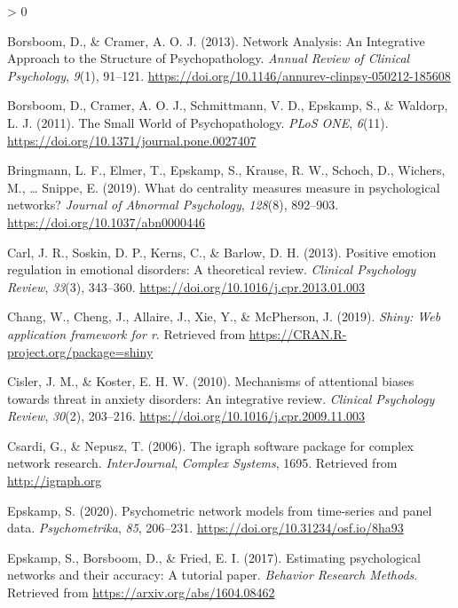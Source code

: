 \documentclass[
  english,
  man]{apa6}
\newlength{\cslhangindent}
\newenvironment{CSLReferences}[2] %
 {%
  \setlength{\parindent}{0pt}
  \ifodd #1 \everypar{\setlength{\hangindent}{\cslhangindent}}\ignorespaces\fi
  \ifnum #2 > 0
  \setlength{\parskip}{#2\baselineskip}
  \fi
 }%
 {}
\begin{document}
\begin{CSLReferences}{1}{0}
\leavevmode\hypertarget{ref-borsboom_network_2013}{}%
Borsboom, D., \& Cramer, A. O. J. (2013). Network {Analysis}: {An} {Integrative} {Approach} to the {Structure} of {Psychopathology}. \emph{Annual Review of Clinical Psychology}, \emph{9}(1), 91--121. \url{https://doi.org/10.1146/annurev-clinpsy-050212-185608}

\leavevmode\hypertarget{ref-borsboom_small_2011}{}%
Borsboom, D., Cramer, A. O. J., Schmittmann, V. D., Epskamp, S., \& Waldorp, L. J. (2011). The {Small} {World} of {Psychopathology}. \emph{PLoS ONE}, \emph{6}(11). \url{https://doi.org/10.1371/journal.pone.0027407}

\leavevmode\hypertarget{ref-bringmann_what_2019}{}%
Bringmann, L. F., Elmer, T., Epskamp, S., Krause, R. W., Schoch, D., Wichers, M., \ldots{} Snippe, E. (2019). What do centrality measures measure in psychological networks? \emph{Journal of Abnormal Psychology}, \emph{128}(8), 892--903. \url{https://doi.org/10.1037/abn0000446}

\leavevmode\hypertarget{ref-Carl2013}{}%
Carl, J. R., Soskin, D. P., Kerns, C., \& Barlow, D. H. (2013). Positive emotion regulation in emotional disorders: {A} theoretical review. \emph{Clinical Psychology Review}, \emph{33}(3), 343--360. \url{https://doi.org/10.1016/j.cpr.2013.01.003}

\leavevmode\hypertarget{ref-R-shiny}{}%
Chang, W., Cheng, J., Allaire, J., Xie, Y., \& McPherson, J. (2019). \emph{Shiny: Web application framework for r}. Retrieved from \url{https://CRAN.R-project.org/package=shiny}

\leavevmode\hypertarget{ref-Cisler2010a}{}%
Cisler, J. M., \& Koster, E. H. W. (2010). Mechanisms of attentional biases towards threat in anxiety disorders: {An} integrative review. \emph{Clinical Psychology Review}, \emph{30}(2), 203--216. \url{https://doi.org/10.1016/j.cpr.2009.11.003}

\leavevmode\hypertarget{ref-R-igraph}{}%
Csardi, G., \& Nepusz, T. (2006). The igraph software package for complex network research. \emph{InterJournal}, \emph{Complex Systems}, 1695. Retrieved from \url{http://igraph.org}

\leavevmode\hypertarget{ref-epskamp_psychometric_2020}{}%
Epskamp, S. (2020). Psychometric network models from time-series and panel data. \emph{Psychometrika}, \emph{85}, 206--231. \url{https://doi.org/10.31234/osf.io/8ha93}

\leavevmode\hypertarget{ref-R-bootnet}{}%
Epskamp, S., Borsboom, D., \& Fried, E. I. (2017). Estimating psychological networks and their accuracy: A tutorial paper. \emph{Behavior Research Methods}. Retrieved from \url{https://arxiv.org/abs/1604.08462}


\end{CSLReferences}
\end{document}

